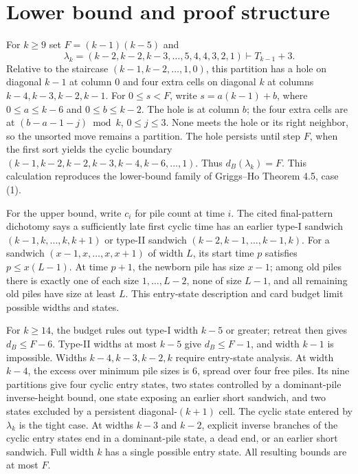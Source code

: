 \documentclass[11pt]{article}
\newcommand{\Tr}{T}
\begin{document}
\section{Lower bound and proof structure}
For $k\geq9$ set $F=(k-1)(k-5)$ and
\[
 \lambda_k=(k-2,k-2,k-3,\ldots,5,4,4,3,2,1)\vdash\Tr_{k-1}+3.
\]
Relative to the staircase $(k-1,k-2,\ldots,1,0)$, this partition has a hole
on diagonal $k-1$ at column $0$ and four extra cells on diagonal $k$ at
columns $k-4,k-3,k-2,k-1$.  For $0\leq s<F$, write
$s=a(k-1)+b$, where $0\leq a\leq k-6$ and $0\leq b\leq k-2$.
The hole is at column $b$; the four extra cells are at
$(b-a-1-j)\bmod k$, $0\leq j\leq3$.  None meets the hole or its right
neighbor, so the unsorted move remains a partition.  The hole persists until
step $F$, when the first sort yields the cyclic boundary
$(k-1,k-2,k-2,k-3,k-4,k-6,\ldots,1)$.  Thus
$d_B(\lambda_k)=F$.  This calculation reproduces the lower-bound family of
Griggs--Ho Theorem 4.5, case (1).

For the upper bound, write $c_i$ for pile count at time $i$.  The cited
final-pattern dichotomy says a sufficiently late first cyclic time has an
earlier type-I sandwich $(k-1,k,\ldots,k,k+1)$ or type-II sandwich
$(k-2,k-1,\ldots,k-1,k)$.  For a sandwich
$(x-1,x,\ldots,x,x+1)$ of width $L$, its start time $p$ satisfies
$p\leq x(L-1)$.  At time $p+1$, the newborn pile has size $x-1$; among old
piles there is exactly one of each size $1,\ldots,L-2$, none of size
$L-1$, and all remaining old piles have size at least $L$.  This entry-state
description and card budget limit possible widths and states.

For $k\geq14$, the budget rules out type-I width $k-5$ or greater; retreat
then gives $d_B\leq F-6$.  Type-II widths at most $k-5$ give
$d_B\leq F-1$, and width $k-1$ is impossible.  Widths
$k-4,k-3,k-2,k$ require entry-state analysis.  At width $k-4$, the excess
over minimum pile sizes is $6$, spread over four free piles.  Its nine
partitions give four cyclic entry states, two states controlled by a
dominant-pile inverse-height bound, one state exposing an earlier short
sandwich, and two states excluded by a persistent diagonal-$(k+1)$ cell.
The cyclic state entered by $\lambda_k$ is the tight case.  At widths
$k-3$ and $k-2$, explicit inverse branches of the cyclic entry states end
in a dominant-pile state, a dead end, or an earlier short sandwich.  Full
width $k$ has a single possible entry state.  All resulting bounds are at
most $F$.
\end{document}

